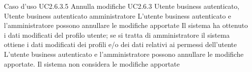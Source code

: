 \UCtitle
{Caso d'uso UC2.6.3.5}
{Annulla modifiche}
\UC
{UC2.6.3}
{Utente business autenticato, Utente business autenticato amministratore}
{L'utente business autenticato e l'amministratore possono annullare le modifiche apportate}
{Il sistema ha ottenuto i dati modificati del profilo utente; se si tratta di amministratore il sistema ottiene i dati modificati dei profili e/o dei dati relativi ai permessi dell'utente}
\scenario
{L'utente business autenticato e l'amministratore possono annullare le modifiche apportate.}
\post
{Il sistema non considera le modifiche apportate}

